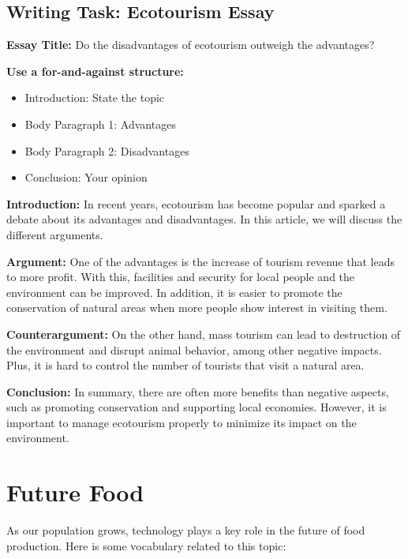 \subsection{Writing Task: Ecotourism Essay}

\textbf{Essay Title:} Do the disadvantages of ecotourism outweigh the advantages?

\textbf{Use a for-and-against structure:}
\begin{itemize}
    \item Introduction: State the topic
    \item Body Paragraph 1: Advantages
    \item Body Paragraph 2: Disadvantages
    \item Conclusion: Your opinion
\end{itemize}

\begin{tcolorbox}[colback=blue!5, colframe=blue!30, title=Sample Essay: Ecotourism]
\textbf{Introduction:} In recent years, ecotourism has become popular and sparked a debate about its advantages and disadvantages. In this article, we will discuss the different arguments.

\textbf{Argument:} One of the advantages is the increase of tourism revenue that leads to more profit. With this, facilities and security for local people and the environment can be improved. In addition, it is easier to promote the conservation of natural areas when more people show interest in visiting them.

\textbf{Counterargument:} On the other hand, mass tourism can lead to destruction of the environment and disrupt animal behavior, among other negative impacts. Plus, it is hard to control the number of tourists that visit a natural area.

\textbf{Conclusion:} In summary, there are often more benefits than negative aspects, such as promoting conservation and supporting local economies. However, it is important to manage ecotourism properly to minimize its impact on the environment.
\end{tcolorbox}

\section{Future Food}

As our population grows, technology plays a key role in the future of food production. Here is some vocabulary related to this topic:

